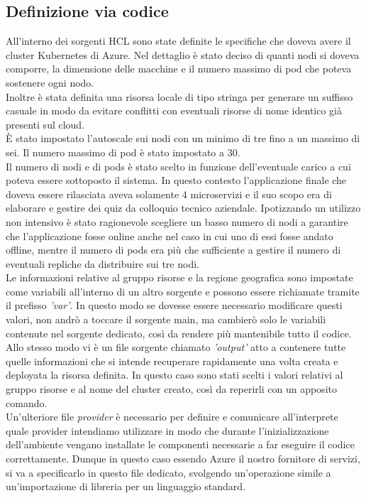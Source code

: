 \documentclass[a4paper,12pt]{report}
\begin{document}
\subsection{Definizione via codice}
All'interno dei sorgenti HCL sono state definite le specifiche che doveva avere il cluster Kubernetes di Azure. Nel dettaglio è stato deciso di quanti nodi si doveva comporre, la dimensione delle macchine e il numero massimo di pod che poteva sostenere ogni nodo. \\Inoltre è stata definita una risorsa locale di tipo stringa per generare un suffisso casuale in modo da evitare conflitti con eventuali risorse di nome identico già presenti sul cloud.\\
È stato impostato l'autoscale sui nodi con un minimo di tre fino a un massimo di sei. Il numero massimo di pod è stato impostato a 30.\\
Il numero di nodi e di pods è stato scelto in funzione dell'eventuale carico a cui poteva essere sottoposto il sistema. In questo contesto l'applicazione finale che doveva essere rilasciata aveva solamente 4 microservizi e il suo scopo era di elaborare e gestire dei quiz da colloquio tecnico aziendale. Ipotizzando un utilizzo non intensivo è stato ragionevole scegliere un basso numero di nodi a garantire che l'applicazione fosse online anche nel caso in cui uno di essi fosse andato offline, mentre il numero di pods era più che sufficiente a gestire il numero di eventuali repliche da distribuire sui tre nodi.\\
Le informazioni relative al gruppo risorse e la regione geografica sono impostate come variabili all'interno di un altro sorgente e possono essere richiamate tramite il prefisso \textit{'var'}. In questo modo se dovesse essere necessario modificare questi valori, non andrò a toccare il sorgente main, ma cambierò solo le variabili contenute nel sorgente dedicato, così da rendere più mantenibile tutto il codice.\\
Allo stesso modo vi è un file sorgente chiamato \textit{'output'} atto a contenere tutte quelle informazioni che si intende recuperare rapidamente una volta creata e deployata la risorsa definita. In questo caso sono stati scelti i valori relativi al gruppo risorse e al nome del cluster creato, così da reperirli con un apposito comando.\\
Un'ulteriore file \textit{provider} è necessario per definire e comunicare all'interprete quale provider intendiamo utilizzare in modo che durante l'inizializzazione dell'ambiente vengano installate le componenti necessarie a far eseguire il codice correttamente. Dunque in questo caso essendo Azure il nostro fornitore di servizi, si va a specificarlo in questo file dedicato, svolgendo un'operazione simile a un'importazione di libreria per un linguaggio standard.\\
\end{document}

